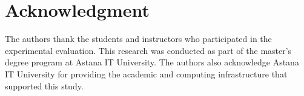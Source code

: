 \documentclass[conference]{IEEEtran}
\begin{document}
\section*{Acknowledgment}

The authors thank the students and instructors who participated in the experimental evaluation. This research was conducted as part of the master’s degree program at Astana IT University. The authors also acknowledge Astana IT University for providing the academic and computing infrastructure that supported this study.


\nocite{Francisco2022}
\nocite{Chrysafiadi2022}
\nocite{pankiewicz2023largelanguagemodelsgpt}
\nocite{AutomatedAssessmentToolsForGrading2022}
\nocite{AdaptiveImmediateFeedbackforBlockBasedProgramming}
\nocite{FeedbackSystemSupportingStudents2022}
\nocite{EvaluationofLLMtoolsforfeedbackgeneration}
\nocite{AutomatingHumanTutorStyleProgrammingFeedback}
\nocite{AITutoringinSDEducation}
\nocite{AutomatedGradingandFeedbackToolsforProgrammingEducationSystematicReview}


\end{document}

